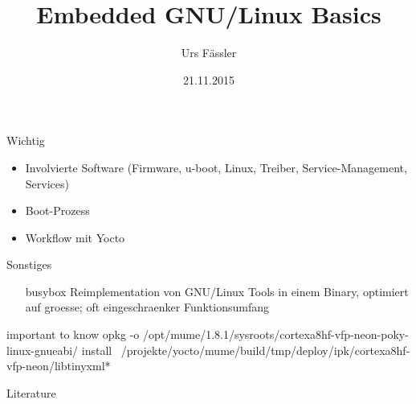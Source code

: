 \documentclass
[
  12pt,
  handout,
  notes=show,
  svgnames		%
]{beamer}
\title{Embedded GNU/Linux Basics}
\author{Urs Fässler}
\date{21.11.2015}
\institute
{
  17. LinuxDay\\
  Dornbirn
}
\begin{document}
\frame{\titlepage}

\begin{frame}{Wichtig}
	\begin{itemize}
		\item Involvierte Software (Firmware, u-boot, Linux, Treiber, Service-Management, Services)
		\item Boot-Prozess
		\item Workflow mit Yocto
	\end{itemize}
\end{frame}






\begin{frame}{Sonstiges}
	\begin{itemize}
		\item[busybox] Reimplementation von GNU/Linux Tools in einem Binary, optimiert auf groesse; oft eingeschraenker Funktionsumfang
	\end{itemize}
\end{frame}


{
\appendix

\begin{frame}{important to know}
opkg -o /opt/mume/1.8.1/sysroots/cortexa8hf-vfp-neon-poky-linux-gnueabi/ install ~/projekte/yocto/mume/build/tmp/deploy/ipk/cortexa8hf-vfp-neon/libtinyxml*
\end{frame}


\begin{frame}[allowframebreaks]{Literature}
	
\end{frame}

}
\end{document}
